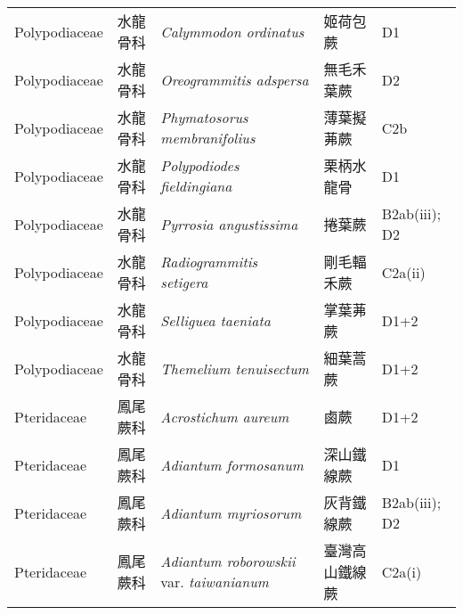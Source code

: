 {\begin{longtable}{p{2.5cm}p{2.5cm}p{4.5cm}p{2.5cm}p{3cm}}
    Polypodiaceae & 水龍骨科 & \textit{Calymmodon ordinatus}  & 姬荷包蕨 & D1 \index{Calymmodon@\textit{Calymmodon}!ordinatus@\textit{ordinatus}}  \index{姬荷包蕨} \\
    Polypodiaceae & 水龍骨科 & \textit{Oreogrammitis adspersa}  & 無毛禾葉蕨 & D2 \index{Oreogrammitis@\textit{Oreogrammitis}!adspersa@\textit{adspersa}}  \index{無毛禾葉蕨} \\
    Polypodiaceae & 水龍骨科 & \textit{Phymatosorus membranifolius}  & 薄葉擬茀蕨 & C2b \index{Phymatosorus@\textit{Phymatosorus}!membranifolius@\textit{membranifolius}}  \index{薄葉擬茀蕨} \\
    Polypodiaceae & 水龍骨科 & \textit{Polypodiodes fieldingiana}  & 栗柄水龍骨 & D1 \index{Polypodiodes@\textit{Polypodiodes}!fieldingiana@\textit{fieldingiana}}  \index{栗柄水龍骨} \\
    Polypodiaceae & 水龍骨科 & \textit{Pyrrosia angustissima}  & 捲葉蕨 & B2ab(iii); D2 \index{Pyrrosia@\textit{Pyrrosia}!angustissima@\textit{angustissima}}  \index{捲葉蕨} \\
    Polypodiaceae & 水龍骨科 & \textit{Radiogrammitis setigera}  & 剛毛輻禾蕨 & C2a(ii) \index{Radiogrammitis@\textit{Radiogrammitis}!setigera@\textit{setigera}}  \index{剛毛輻禾蕨} \\
    Polypodiaceae & 水龍骨科 & \textit{Selliguea taeniata}  & 掌葉茀蕨 & D1+2 \index{Selliguea@\textit{Selliguea}!taeniata@\textit{taeniata}}  \index{掌葉茀蕨} \\
    Polypodiaceae & 水龍骨科 & \textit{Themelium tenuisectum}  & 細葉蒿蕨 & D1+2 \index{Themelium@\textit{Themelium}!tenuisectum@\textit{tenuisectum}}  \index{細葉蒿蕨} \\
    Pteridaceae & 鳳尾蕨科 & \textit{Acrostichum aureum}  & 鹵蕨 & D1+2 \index{Acrostichum@\textit{Acrostichum}!aureum@\textit{aureum}}  \index{鹵蕨} \\
    Pteridaceae & 鳳尾蕨科 & \textit{Adiantum formosanum}  & 深山鐵線蕨 & D1 \index{Adiantum@\textit{Adiantum}!formosanum@\textit{formosanum}}  \index{深山鐵線蕨} \\
    Pteridaceae & 鳳尾蕨科 & \textit{Adiantum myriosorum}  & 灰背鐵線蕨 & B2ab(iii); D2 \index{Adiantum@\textit{Adiantum}!myriosorum@\textit{myriosorum}}  \index{灰背鐵線蕨} \\
    Pteridaceae & 鳳尾蕨科 & \textit{Adiantum roborowskii} var. \textit{taiwanianum}  & 臺灣高山鐵線蕨 & C2a(i) \index{Adiantum@\textit{Adiantum}!roborowskii@\textit{roborowskii}!var. taiwanianum@var. \textit{taiwanianum}}  \index{臺灣高山鐵線蕨} \\

\end{longtable}}
